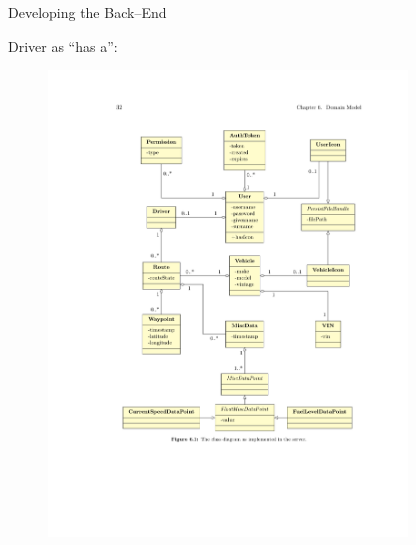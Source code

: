 \begin{frame}[t]{Developing the Back--End}
             {
            Driver as ``has a'':
            \begin{figure}[htb]
                \centering
                \includegraphics[width=0.85\textwidth, trim={5cm 13.8cm 0cm 3.5cm},clip]{class.pdf}
            \end{figure}
            }


\end{frame}
